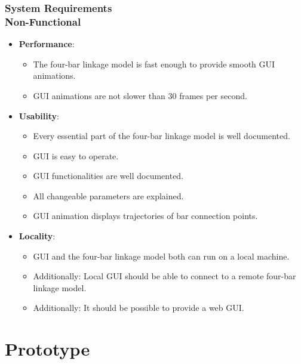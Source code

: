 \documentclass[ucs,10pt]{beamer}
\begin{document}
\begin{frame}
\frametitle{System Requirements \\
    \small \color{rwth-blue} Non-Functional}
    \begin{itemize}
        \item \textbf{Performance}:
        \begin{itemize}
            \item The four-bar linkage model is fast enough to provide smooth GUI animations.
            \item GUI animations are not slower than 30 frames per second.
        \end{itemize}
        \item \textbf{Usability}:
        \begin{itemize}
            \item Every essential part of the four-bar linkage model is well documented.
            \item GUI is easy to operate.
            \item GUI functionalities are well documented.
            \item All changeable parameters are explained.
            \item GUI animation displays trajectories of bar connection points.
        \end{itemize}
        \item \textbf{Locality}:
        \begin{itemize}
            \item GUI and the four-bar linkage model both can run on a local machine.
            \item Additionally: Local GUI should be able to connect to a remote four-bar linkage model.
            \item Additionally: It should be possible to provide a web GUI.
        \end{itemize}
    \end{itemize}
\end{frame}

\section{Prototype}
\end{document}

